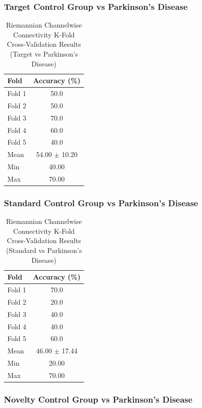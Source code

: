 \documentclass[12pt]{report}
\begin{document}
\subsubsection{Target Control Group vs Parkinson's Disease}

\begin{table}[h]
\centering
\caption{Riemannian Channelwise Connectivity K-Fold Cross-Validation Results (Target vs Parkinson's Disease)}
\begin{tabular}{lc}
\hline
\textbf{Fold} & \textbf{Accuracy (\%)} \\
\hline
Fold 1 & 50.0 \\
Fold 2 & 50.0 \\
Fold 3 & 70.0 \\
Fold 4 & 60.0 \\
Fold 5 & 40.0 \\
\hline
Mean & 54.00 $\pm$ 10.20 \\
Min & 40.00 \\
Max & 70.00 \\
\hline
\end{tabular}
\end{table}

\subsubsection{Standard Control Group vs Parkinson's Disease}

\begin{table}[h]
\centering
\caption{Riemannian Channelwise Connectivity K-Fold Cross-Validation Results (Standard vs Parkinson's Disease)}
\begin{tabular}{lc}
\hline
\textbf{Fold} & \textbf{Accuracy (\%)} \\
\hline
Fold 1 & 70.0 \\
Fold 2 & 20.0 \\
Fold 3 & 40.0 \\
Fold 4 & 40.0 \\
Fold 5 & 60.0 \\
\hline
Mean & 46.00 $\pm$ 17.44 \\
Min & 20.00 \\
Max & 70.00 \\
\hline
\end{tabular}
\end{table}

\subsubsection{Novelty Control Group vs Parkinson's Disease}
\end{document}
